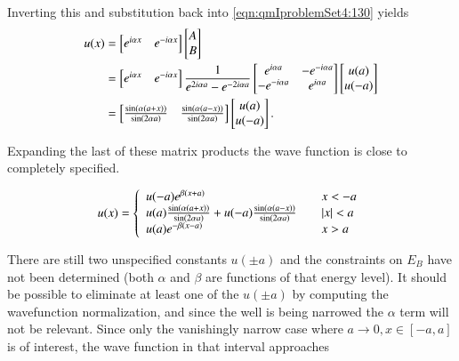 Inverting this and substitution back into \ref{eqn:qmIproblemSet4:130} yields
\begin{align*}
u(x) 
&=
\begin{bmatrix}
e^{i\alpha x} & e^{-i\alpha x}
\end{bmatrix}
\begin{bmatrix}
A \\
B
\end{bmatrix} \\
&=
\begin{bmatrix}
e^{i\alpha x} & e^{-i\alpha x}
\end{bmatrix}
\frac{1}{e^{2 i \alpha a} - e^{-2 i \alpha a}}
\begin{bmatrix}
e^{i \alpha a} & -e^{-i \alpha a} \\
-e^{-i \alpha a} & e^{i \alpha a}
\end{bmatrix}
\begin{bmatrix}
u(a) \\
u(-a)
\end{bmatrix} \\
&=
\begin{bmatrix}
\frac{\sin(\alpha (a + x))}{\sin(2 \alpha a)} &
\frac{\sin(\alpha (a - x))}{\sin(2 \alpha a)}
\end{bmatrix}
\begin{bmatrix}
u(a) \\
u(-a)
\end{bmatrix}.
\end{align*}

Expanding the last of these matrix products the wave function is close to completely specified.

\begin{equation}\label{eqn:qmIproblemSet4:140}
u(x) =
\left\{
\begin{array}{l l}
u(-a) e^{\beta(x+a)}
 & \quad \mbox{$x < -a$} \\
u(a) \frac{\sin(\alpha (a + x))}{\sin(2 \alpha a)} +
u(-a) \frac{\sin(\alpha (a - x))}{\sin(2 \alpha a)}
 & \quad \mbox{$\left\lvert{x}\right\rvert < a$} \\
u(a) e^{-\beta(x-a)}
 & \quad \mbox{$x > a$} \\
\end{array}
\right.
\end{equation}

There are still two unspecified constants $u(\pm a)$ and the constraints on $E_B$ have not been determined (both $\alpha$ and $\beta$ are functions of that energy level).  It should be possible to eliminate at least one of the $u(\pm a)$ by computing the wavefunction normalization, and since the well is being narrowed the $\alpha$ term will not be relevant.  Since only the vanishingly narrow case where $a \rightarrow 0, x \in [-a,a]$ is of interest, the wave function in that interval approaches

